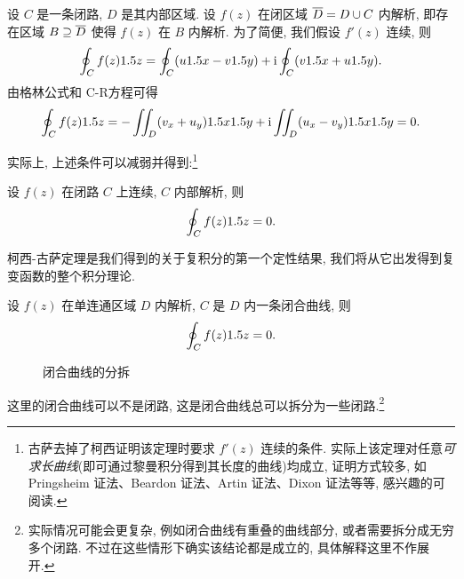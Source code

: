 设 $C$ 是一条闭路, $D$ 是其内部区域.
设 $f(z)$ 在闭区域 $\overline D=D\cup C$ 内解析, 即存在区域 $B\supseteq\overline D$ 使得 $f(z)$ 在 $B$ 内解析.
为了简便, 我们假设 $f'(z)$ 连续,
则
\[
   \oint_C f(z)1.5 z
  =\oint_C (u1.5 x-v1.5 y)+\mathrm{i}\oint_C (v1.5 x+u1.5 y).
\]
由格林公式和 C-R方程可得
\[
   \oint_C f(z)1.5 z
  =-\iint_D(v_x+u_y)1.5 x1.5 y+\mathrm{i}\iint_D(u_x-v_y)1.5 x1.5 y
  =0.
\]

实际上, 上述条件可以减弱并得到:\footnote{
  古萨去掉了柯西证明该定理时要求 $f'(z)$ 连续的条件.
  实际上该定理对任意\emph{可求长曲线}(即可通过黎曼积分得到其长度的曲线)均成立, 证明方式较多, 如 Pringsheim 证法、Beardon 证法、Artin 证法、Dixon 证法等等, 感兴趣的可阅读\cite{Ahlfors2022,FanHe1987,ShiLiu1998,ZhuangZhang1984}.
}
\begin{theorem}[柯西-古萨定理]
  \label{thm:Cauchy-Goursat}
  设 $f(z)$ 在闭路 $C$ 上连续, $C$ 内部解析, 则
  \[
    \oint_C f(z)1.5 z=0.
  \]
\end{theorem}

柯西-古萨定理是我们得到的关于复积分的第一个定性结果, 我们将从它出发得到复变函数的整个积分理论.

\begin{corollary}
  设 $f(z)$ 在单连通区域 $D$ 内解析, $C$ 是 $D$ 内一条闭合曲线, 则
  \[
    \oint_C f(z)1.5 z=0.
  \]
\end{corollary}

\begin{figure}[H]
  \centering
  \caption{闭合曲线的分拆}
\end{figure}

这里的闭合曲线可以不是闭路, 这是闭合曲线总可以拆分为一些闭路.\footnote{
  实际情况可能会更复杂, 例如闭合曲线有重叠的曲线部分, 或者需要拆分成无穷多个闭路.
  不过在这些情形下确实该结论都是成立的, 具体解释这里不作展开.
}

